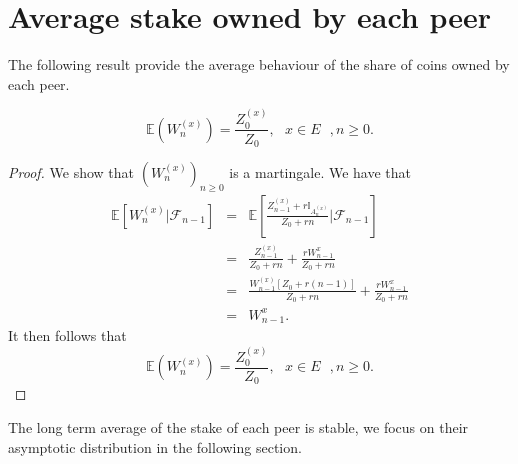 \section{Average stake owned by each peer}
The following result provide the average behaviour of the share of coins owned by each peer.
\begin{prop}\label{prop:average_stakes}
$$
\mathbb{E}\left(W_n^{(x)}\right) = \frac{Z_0^{(x)}}{Z_0},\text{ }x\in E\text{ }, n\geq0.
$$
\end{prop}
\begin{proof}
We show that $(W_n^{(x)})_{n\geq0}$ is a martingale. We have that 
\begin{eqnarray*}
\mathbb{E}\left[W_n^{(x)}|\mathcal{F}_{n-1}\right]&=& \mathbb{E}\left[\frac{Z^{(x)}_{n-1} + r\mathbb{I}_{A_n^{(x)}}}{Z_0 + rn}\Big \rvert\mathcal{F}_{n-1}\right]\\
&=& \frac{Z^{(x)}_{n-1} }{Z_0 + rn}+\frac{rW_{n-1}^{x}}{Z_0 + rn}\\\
&=& \frac{W_{n-1}^{(x)}[Z_0 + r(n-1)]}{Z_0 + rn}+\frac{rW_{n-1}^{x}}{Z_0 + rn}\\
&=&W_{n-1}^{x}.
\end{eqnarray*}
It then follows that 
$$
\mathbb{E}\left(W_n^{(x)}\right) = \frac{Z_0^{(x)}}{Z_0},\text{ }x\in E\text{ }, n\geq0.
$$
\end{proof}
The long term average of the stake of each peer is stable, we focus on their asymptotic distribution in the following section.
